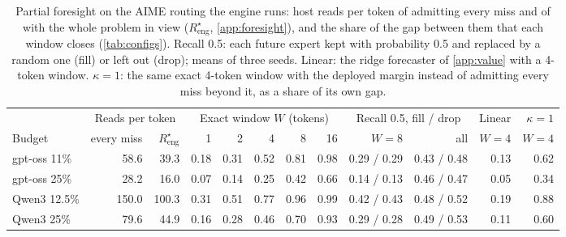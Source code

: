 \begin{table}[t]\centering\small
\caption{Partial foresight on the AIME routing the engine runs: host reads per token of admitting every miss and of
\MinOne{} with the whole problem in view ($R^\star_{\mathrm{eng}}$, \cref{app:foresight}), and the share of the gap between
them that each window closes (\cref{tab:configs}). Recall 0.5:
each future expert kept with probability 0.5 and replaced by a random one (fill) or left out (drop); means of three
seeds. Linear: the ridge forecaster of \cref{app:value} with a 4-token window. $\kappa{=}1$: the same exact 4-token
window with the deployed margin instead of admitting every miss beyond it, as a share of its own gap.}\label{tab:value}
\begin{tabular}{lrrrrrrrrrrr}\toprule
 & \multicolumn{2}{c}{Reads per token} & \multicolumn{5}{c}{Exact window $W$ (tokens)} & \multicolumn{2}{c}{Recall 0.5, fill / drop} & Linear & $\kappa{=}1$ \\
Budget & every miss & $R^\star_{\mathrm{eng}}$ & 1 & 2 & 4 & 8 & 16 & $W{=}8$ & all & $W{=}4$ & $W{=}4$ \\\midrule
gpt-oss 11\% & 58.6 & 39.3 & 0.18 & 0.31 & 0.52 & 0.81 & 0.98 & 0.29 / 0.29 & 0.43 / 0.48 & 0.13 & 0.62 \\
gpt-oss 25\% & 28.2 & 16.0 & 0.07 & 0.14 & 0.25 & 0.42 & 0.66 & 0.14 / 0.13 & 0.46 / 0.47 & 0.05 & 0.34 \\
Qwen3 12.5\% & 150.0 & 100.3 & 0.31 & 0.51 & 0.77 & 0.96 & 0.99 & 0.42 / 0.43 & 0.48 / 0.52 & 0.19 & 0.88 \\
Qwen3 25\% & 79.6 & 44.9 & 0.16 & 0.28 & 0.46 & 0.70 & 0.93 & 0.29 / 0.28 & 0.49 / 0.53 & 0.11 & 0.60 \\
\bottomrule\end{tabular}\end{table}
